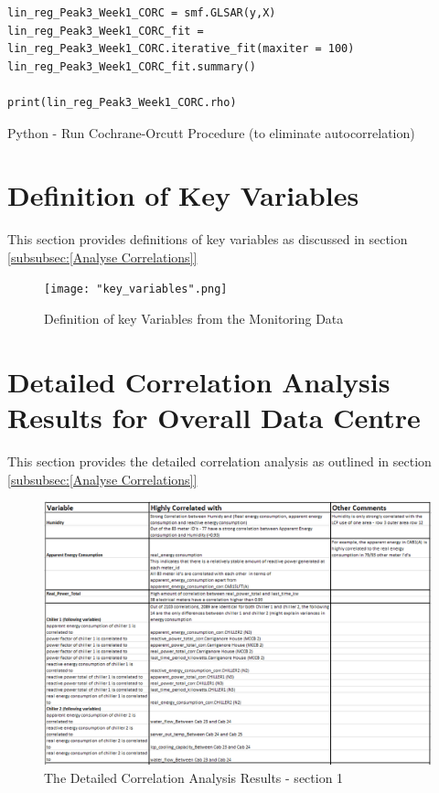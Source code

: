 \documentclass[12pt]{scrartcl}
\begin{document}
\begin{listing}[H]
\begin{verbatim}
lin_reg_Peak3_Week1_CORC = smf.GLSAR(y,X)
lin_reg_Peak3_Week1_CORC_fit = lin_reg_Peak3_Week1_CORC.iterative_fit(maxiter = 100)
lin_reg_Peak3_Week1_CORC_fit.summary()

print(lin_reg_Peak3_Week1_CORC.rho) 

\end{verbatim}
\caption{Python - Run Cochrane-Orcutt Procedure (to eliminate autocorrelation)}
\label{list:[Python - Run Cochrane-Orcutt Procedure (to eliminate autocorrelation)]}
\end{listing}



\section{Definition of Key Variables}
\label{sec:[Definition of key Variables]}

This section provides definitions of key variables as discussed in section \ref{subsubsec:[Analyse Correlations]}

\begin{figure}[h]
  \caption{Definition of key Variables from the Monitoring Data}
  \label{fig:key_variables}
  \centering
    \texttt{[image: "key\_variables".png]}
\end{figure} 



\section{Detailed Correlation Analysis Results for Overall Data Centre}
\label{sec:[Data Centre Correlation Analysis Results]}
This section provides the detailed correlation analysis as outlined in section \ref{subsubsec:[Analyse Correlations]}


\begin{figure}[H]
  \caption{The Detailed Correlation Analysis Results - section 1}
  \label{fig:Correlation_Analysis_1}
  \centering
    \includegraphics[scale=0.50]{Correlation_Analysis_1}
\end{figure} 
\end{document}
